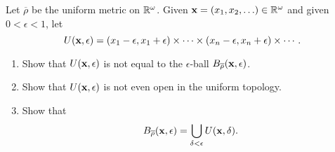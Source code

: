%
\begin{exercise}[ID=2.20.6]
  Let $\overline{\rho}$ be the uniform metric on $\mathbb{R}^\omega$.
  Given $\mathbf{x} = (x_1, x_2, \ldots) \in \mathbb{R}^\omega$ and given $0 < \epsilon < 1$, let
  \begin{equation*}
    U(\mathbf{x}, \epsilon) = (x_1 - \epsilon, x_1 + \epsilon) \times \cdots \times (x_n - \epsilon, x_n + \epsilon) \times \cdots.
  \end{equation*}
  \begin{enumerate}[label={(\alph*)}, align=left, leftmargin=\parindent, listparindent=\parindent, labelwidth=0pt, itemindent=!]
    \item Show that $U(\mathbf{x}, \epsilon)$ is not equal to the $\epsilon$-ball $B_{\overline{\rho}}(\mathbf{x}, \epsilon)$.
    \item Show that $U(\mathbf{x}, \epsilon)$ is not even open in the uniform topology.
    \item Show that
      \begin{equation*}
        B_{\overline{\rho}}(\mathbf{x}, \epsilon) = \bigcup_{\delta < \epsilon} U(\mathbf{x}, \delta).
      \end{equation*}
  \end{enumerate}
\end{exercise}
%
